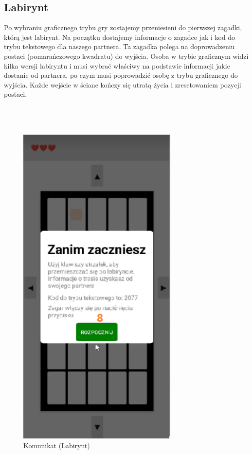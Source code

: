 \subsection{Labirynt}
Po wybraniu graficznego trybu gry zostajemy przeniesieni do pierwszej zagadki, którą jest labirynt. Na początku dostajemy informacje o zagadce jak i kod do trybu tekstowego dla naszego partnera. Ta zagadka polega na doprowadzeniu postaci (pomarańczowego kwadratu) do wyjścia. Osoba w trybie graficznym widzi kilka wersji labiryntu i musi wybrać właściwy na podstawie informacji jakie dostanie od partnera, po czym musi poprowadzić osobę z trybu graficznego do wyjścia. Każde wejście w ściane kończy się utratą życia i zresetowaniem pozycji postaci.
\\
\\
\\
\\
	\begin{figure}[!htb]
	\begin{center}
		\includegraphics[width=8cm]{rys/opis2.png}
		\caption{Komunikat (Labirynt)}
		\label{rys:rysunek001}
	\end{center}
\end{figure}

